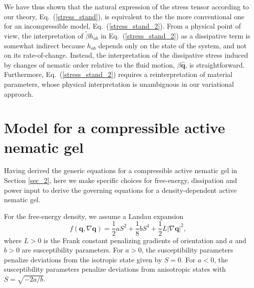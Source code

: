 \documentclass[12pt]{iopart}
\begin{document}
	We have thus shown that the natural expression of the stress tensor according to our theory,  Eq.~(\ref{stress_stand}), is equivalent to the the more conventional one for an incompressible model,  Eq.~(\ref{stress_stand_2}). From a physical point of view, the interpretation of $\widetilde{\beta} h_{ab}$ in Eq.~(\ref{stress_stand_2}) as a dissipative term is somewhat indirect because $h_{ab}$ depends only on the state of the system, and not on its rate-of-change. Instead, the interpretation of the dissipative stress induced by changes of nematic order relative to the fluid motion, $\beta \widehat{\bm{q}}$, is straightforward. Furthermore, Eq.~(\ref{stress_stand_2}) requires a reinterpretation of material parameters, whose physical interpretation is unambiguous in our variational approach. 
	
	
	\section{Model for a compressible active nematic gel} \label{sec_3}
	
	Having derived the generic equations for a compressible active nematic gel in Section \ref{sec_2}, here we make specific choices for free-energy, dissipation and power input to derive the governing equations for a density-dependent active nematic gel. 
	
	For the free-energy density, we assume a Landau expansion
	\begin{equation} 
		\label{eq:landau}
		f(\bm{q},\nabla\bm{q}) = \frac{1}{2}a S^2 + \frac{1}{8}b S^4 + \frac{1}{2} L \left|\nabla \bm{q}\right|^2,
	\end{equation}
	where $L>0$ is the Frank constant penalizing gradients of orientation and $a$ and $b>0$ are susceptibility parameters. For $a>0$, the susceptibility parameters penalize deviations from the isotropic state given by $S=0$. For $a<0$, the susceptibility parameters penalize deviations from anisotropic states with $S= \sqrt{-2a/b}$. 
	
\end{document}
